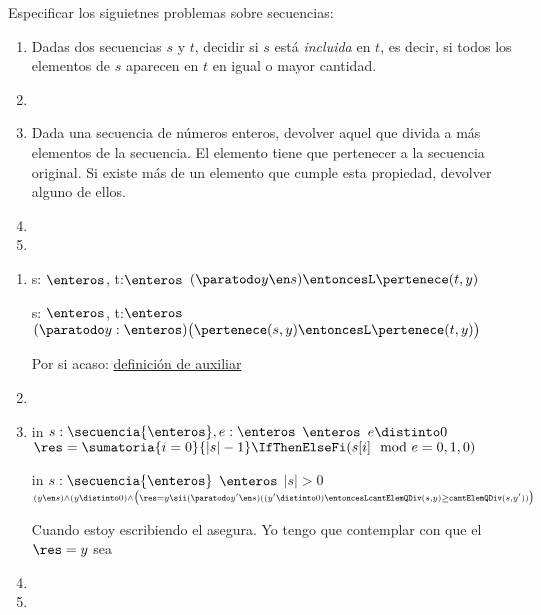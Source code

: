 \begin{enunciado}{\ejercicio}
  Especificar los siguietnes problemas sobre secuencias:
  \begin{enumerate}[label=\alph*)]
    \item Dadas dos secuencias $s$ y $t$, decidir si $s$ está \textit{incluida} en $t$, es decir,
          si todos los elementos de $s$ aparecen en $t$ en igual o mayor cantidad.
    \item

    \item Dada una secuencia de números enteros, devolver aquel que divida a más elementos
          de la secuencia. El elemento tiene que pertenecer a la secuencia original.
          Si existe más de un elemento que cumple esta propiedad, devolver alguno de ellos.
    \item
    \item
  \end{enumerate}
\end{enunciado}

\begin{enumerate}[label=\alph*)]
  \item
        {s: $\enteros$, t:$\enteros$}
        {\Bool}
        {\True}
        {$(\paratodo y \en s) \entoncesL \pertenece(t,y)$}

        {s: $\enteros$, t:$\enteros$}
        {\Bool}
        {\True}
        {$(\paratodo y :\enteros)
            \bigl(
            \pertenece(s,y) \entoncesL \pertenece(t,y)
            \bigr)$}

        Por si acaso: \hyperlink{aux:pertenece}{definición de auxiliar \pertenece}


  \item

  \item
        {in $s: \secuencia{\enteros}, e: \enteros$} {$\enteros$}
        {$e \distinto 0$}
        {$\res = \sumatoria{i=0}{|s| - 1} \IfThenElseFi(s[i] \mod e = 0, 1, 0)$}\par\bigskip

        {in $s: \secuencia{\enteros}$} {$\enteros$}
        {$|s| > 0$}
        {$\scriptstyle
            (y \en s) \land (y \distinto 0) \land
            \bigl(
            \res = y \sii
            (\paratodo y' \en s)
            ( (y'\distinto 0) \entoncesL \texttt{cantElemQDiv}(s, y) \geq \texttt{cantElemQDiv}(s, y'))
            \bigr)$ }

        Cuando estoy escribiendo el asegura. Yo tengo que contemplar con que el $\res = y$ sea

  \item
  \item
\end{enumerate}
